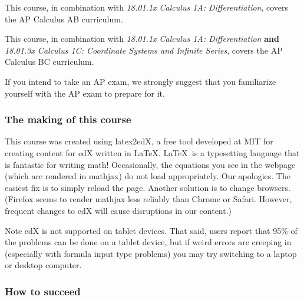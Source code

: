 \documentclass[pdftex, brazil, 12pt, twoside]{article}
\begin{document}
This course, in combination with \emph{18.01.1x Calculus 1A: Differentiation}, covers the
AP Calculus AB curriculum.

This course, in combination with \emph{18.01.1x Calculus 1A: Differentiation} \textbf{and}
\emph{18.01.3x Calculus 1C: Coordinate Systems and Infinite Series}, covers the AP Calculus BC
curriculum.

If you intend to take an AP exam, we strongly suggest that you familiarize yourself with
the AP exam to prepare for it. 

\subsubsection{The making of this course}
\label{gs-ol-making}

This course was created using latex2edX, a free tool developed at MIT for creating
content for edX written in \LaTeX. \LaTeX\ is a typesetting language that is fantastic
for writing math! Occasionally, the equations you see in the webpage (which are rendered
in mathjax) do not load appropriately. Our apologies. The easiest fix is to simply
reload the page. Another solution is to change browsers. (Firefox seems to render
mathjax less reliably than Chrome or Safari. However, frequent changes to edX
will cause disruptions in our content.)

Note edX is not supported on tablet devices. That said, users report that 95\% of
the problems can be done on a tablet device, but if weird errors are creeping
in (especially with formula input type problems) you may try switching to a laptop
or desktop computer.

\begin{figure}[H]
  \begin{center}
    \label{fig:latex2edx}
  \end{center}
\end{figure}
 
\subsubsection{How to succeed}
\label{gs-ol-succeed}
\end{document}
